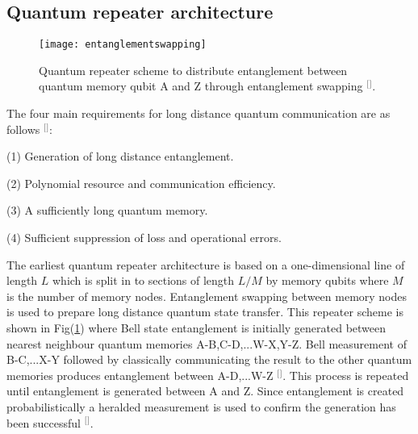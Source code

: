 \subsection{Quantum repeater architecture}
\begin{figure}[b]
\centering
\texttt{[image: entanglementswapping]}
\caption{\label{fig:entanglementswapping} Quantum repeater scheme to distribute entanglement between quantum memory qubit A and Z through entanglement swapping $^{[}$\citep{Sangouard2011QuantumOptics}$^{]}$.}
\end{figure}
\noindent The four main requirements for long distance quantum communication are as follows $^{[}$\citep{Briegel1998QuantumCommunication,Muralidharan2016OptimalCommunication}$^{]}$:

\vspace{2mm}
\noindent (1) Generation of long distance entanglement.

 
\noindent (2) Polynomial resource and communication efficiency.


\noindent (3) A sufficiently long quantum memory.


\noindent (4) Sufficient suppression of loss and operational errors.
\vspace{2mm}
 
\noindent The earliest quantum repeater architecture is based on a one-dimensional line of length $L$ which is split in to sections of length  $L/M$ by memory qubits where $M$ is the number of memory nodes. Entanglement swapping between memory nodes is used to prepare long distance quantum state transfer. This repeater scheme is shown in Fig(\ref{fig:entanglementswapping}) where Bell state entanglement is initially generated between nearest neighbour quantum memories A-B,C-D,...W-X,Y-Z. Bell measurement of B-C,...X-Y followed by classically communicating the result to the other quantum memories produces entanglement between A-D,...W-Z $^{[}$\citep{Sangouard2011QuantumOptics}$^{]}$. This process is repeated until entanglement is generated between A and Z. Since entanglement is created probabilistically a heralded measurement is used to confirm the generation has been successful $^{[}$\citep{Chou2005Measurement-inducedEnsembles}$^{]}$.


